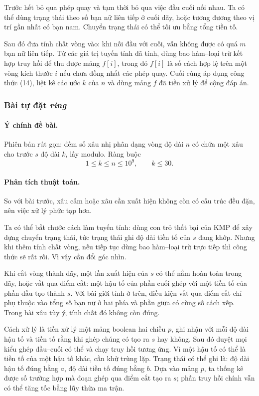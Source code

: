\documentclass[11pt]{article}
\begin{document}
Trước hết bỏ qua phép quay và tạm thời bỏ qua việc đầu cuối nối nhau. Ta có
thể dùng trạng thái theo số bạn nữ liên tiếp ở cuối dãy, hoặc tương đương theo
vị trí gần nhất có bạn nam. Chuyển trạng thái có thể tối ưu bằng tổng tiền tố.

Sau đó đưa tính chất vòng vào: khi nối đầu với cuối, vẫn không được có quá
\(m\) bạn nữ liên tiếp. Từ các giá trị tuyến tính đã tính, dùng bao
hàm--loại trừ kết hợp truy hồi để thu được mảng \(f[i]\), trong đó \(f[i]\) là
số cách hợp lệ trên một vòng kích thước \(i\) nếu chưa đồng nhất các phép quay.
Cuối cùng áp dụng công thức (14), liệt kê các ước \(k\) của \(n\) và dùng mảng
\(f\) đã tiền xử lý để cộng đáp án.

\subsubsection{Bài tự đặt \emph{ring}}

\paragraph{Ý chính đề bài.}
Phiên bản rút gọn: đếm số xâu nhị phân dạng vòng độ dài \(n\) có chứa một xâu
cho trước \(s\) độ dài \(k\), lấy modulo. Ràng buộc
\[
  1\le k\le n\le 10^9,\qquad k\le 30.
\]

\paragraph{Phân tích thuật toán.}
So với bài trước, xâu cấm hoặc xâu cần xuất hiện không còn có cấu trúc đều
đặn, nên việc xử lý phức tạp hơn.

Ta có thể bắt chước cách làm tuyến tính: dùng con trỏ thất bại của KMP để xây
dựng chuyển trạng thái, tức trạng thái ghi độ dài tiền tố của \(s\) đang khớp.
Nhưng khi thêm tính chất vòng, nếu tiếp tục dùng bao hàm--loại trừ trực tiếp
thì công thức sẽ rất rối. Vì vậy cần đổi góc nhìn.

Khi cắt vòng thành dãy, một lần xuất hiện của \(s\) có thể nằm hoàn toàn trong
dãy, hoặc vắt qua điểm cắt: một hậu tố của phần cuối ghép với một tiền tố của
phần đầu tạo thành \(s\). Với bài giới tính ở trên, điều kiện vắt qua điểm cắt
chỉ phụ thuộc vào tổng số bạn nữ ở hai phía và phần giữa có cùng số cách xếp.
Trong bài xâu tùy ý, tính chất đó không còn đúng.

Cách xử lý là tiền xử lý một mảng boolean hai chiều \(p\), ghi nhận với mỗi độ
dài hậu tố và tiền tố rằng khi ghép chúng có tạo ra \(s\) hay không. Sau đó
duyệt mọi kiểu ghép đầu--cuối có thể và chạy truy hồi tương ứng. Vì một hậu tố
có thể là tiền tố của một hậu tố khác, cần khử trùng lặp. Trạng thái có thể
ghi là: độ dài hậu tố đúng bằng \(a\), độ dài tiền tố đúng bằng \(b\). Dựa vào
mảng \(p\), ta thống kê được số trường hợp mà đoạn ghép qua điểm cắt tạo ra
\(s\); phần truy hồi chính vẫn có thể tăng tốc bằng lũy thừa ma trận.
\end{document}
